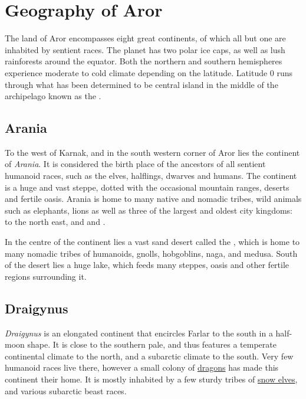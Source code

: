 \section{Geography of Aror}
\label{sec:Geography}

The land of Aror encompasses eight great continents, of which all but one are
inhabited by sentient races. The planet has two polar ice caps, as well as lush
rainforests around the equator. Both the northern and southern hemispheres
experience moderate to cold climate depending on the latitude. Latitude 0 runs
through what has been determined to be central island in the middle of the
archipelago known as the .

\subsection{Arania}
\label{sec:Arania}

To the west of Karnak, and in the south western corner of Aror lies the
continent of \emph{Arania}. It is considered the birth place of the ancestors
of all sentient humanoid races, such as the elves, halflings, dwarves and
humans. The continent is a huge and vast steppe, dotted with the occasional
mountain ranges, deserts and fertile oasis. Arania is home to many native and
nomadic tribes, wild animals such as elephants, lions as well as three of the
largest and oldest city kingdoms:  to the north
east, and  and .

In the centre of the continent lies a vast sand desert called the
, which is home to many nomadic tribes of humanoids,
gnolls, hobgoblins, naga, and medusa. South of the desert lies a huge lake,
which feeds many steppes, oasis and other fertile regions surrounding it.

\subsection{Draigynus}
\label{sec:Draigynus}

\emph{Draigynus} is an elongated continent that encircles Farlar to the south
in a half-moon shape. It is close to the southern pale, and thus features a
temperate continental climate to the north, and a subarctic climate to the
south. Very few humanoid races live there, however a small colony of
\hyperref[sec:Dragons]{dragons} has made this continent their home. It is
mostly inhabited by a few sturdy tribes of \hyperref[sec:Snow Elves]{snow
  elves}, and various subarctic beast races.


